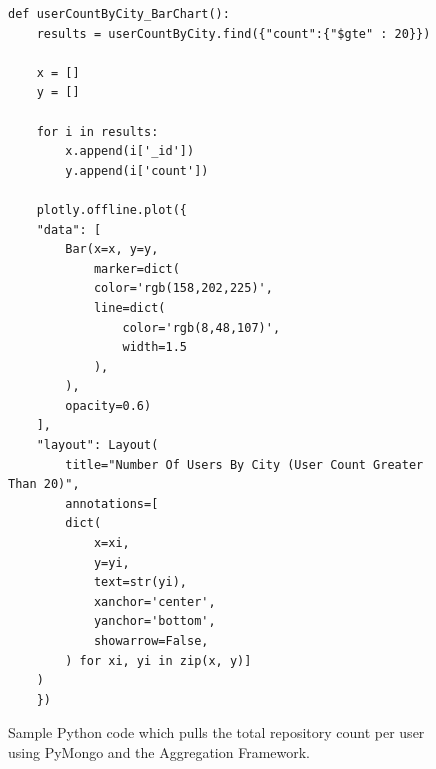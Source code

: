 \begin{figure}
\footnotesize
\begin{lstlisting}
def userCountByCity_BarChart():
    results = userCountByCity.find({"count":{"$gte" : 20}})

    x = []
    y = []

    for i in results:
        x.append(i['_id'])
        y.append(i['count'])

    plotly.offline.plot({
    "data": [
        Bar(x=x, y=y,
            marker=dict(
            color='rgb(158,202,225)',
            line=dict(
                color='rgb(8,48,107)',
                width=1.5
            ),
        ),
        opacity=0.6)
    ],
    "layout": Layout(
        title="Number Of Users By City (User Count Greater Than 20)",
        annotations=[
        dict(
            x=xi,
            y=yi,
            text=str(yi),
            xanchor='center',
            yanchor='bottom',
            showarrow=False,
        ) for xi, yi in zip(x, y)]
    )
    })
\end{lstlisting}
\normalsize
\caption{Sample Python code which pulls the total repository count per user using PyMongo and the Aggregation Framework.}
\label{fig:user-count-by-city-code}
\end{figure}


